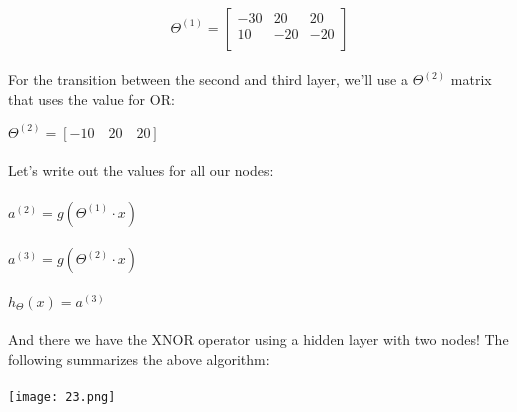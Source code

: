 \documentclass[UTF8]{ctexart}
\begin{document}
\paragraph{}
\begin{algorithm}
\begin{equation}
\Theta^{(1)}=\left[\begin{array}{ccc}
-30&20&20\\
10&-20&-20\\
\end{array}\right]
\end{equation}
\end{algorithm}
\paragraph{}
For the transition between the second and third layer, we'll use a $\Theta^{(2)}$ matrix that uses the value for OR:
\begin{algorithm}
$\Theta^{(2)}=[-10 \quad 20 \quad 20]$
\end{algorithm}
\newpage
\paragraph{}
Let's write out the values for all our nodes:
\paragraph{}
\begin{algorithm}
\paragraph{}
$a^{(2)}=g(\Theta^{(1)} \cdot x)$
\paragraph{}
$a^{(3)}=g(\Theta^{(2)} \cdot x)$
\paragraph{}
$h_{\Theta}(x)=a^{(3)}$
\end{algorithm}
\paragraph{}
And there we have the XNOR operator using a hidden layer with two nodes! The following summarizes the above algorithm:
\paragraph{}
\texttt{[image: 23.png]}
\newpage
\end{document}

